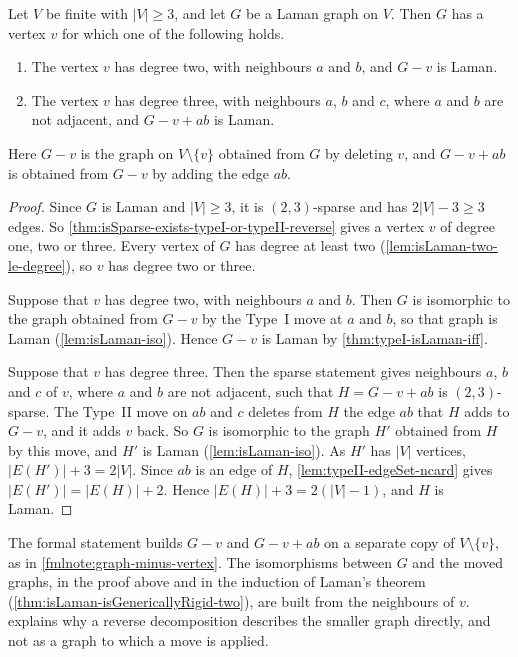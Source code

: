 \begin{theorem}
  \label{thm:isLaman-exists-typeI-or-typeII-reverse}
  \leanok
  Let $V$ be finite with $|V| \ge 3$, and let $G$ be a Laman graph on
  $V$. Then $G$ has a vertex $v$ for which one of the following holds.
  \begin{enumerate}
    \item The vertex $v$ has degree two, with neighbours $a$ and $b$,
      and $G - v$ is Laman.
    \item The vertex $v$ has degree three, with neighbours $a$, $b$ and
      $c$, where $a$ and $b$ are not adjacent, and $G - v + ab$ is
      Laman.
  \end{enumerate}
  Here $G - v$ is the graph on $V \setminus \{v\}$ obtained from $G$
  by deleting $v$, and $G - v + ab$ is obtained from $G - v$ by adding
  the edge $ab$.
\end{theorem}
\begin{proof}
  \leanok
  Since $G$ is Laman and $|V| \ge 3$, it is $(2,3)$-sparse and has
  $2|V| - 3 \ge 3$ edges. So
  \cref{thm:isSparse-exists-typeI-or-typeII-reverse} gives a vertex
  $v$ of degree one, two or three. Every vertex of $G$ has degree at
  least two (\cref{lem:isLaman-two-le-degree}), so $v$ has degree two
  or three.

  Suppose that $v$ has degree two, with neighbours $a$ and $b$. Then
  $G$ is isomorphic to the graph obtained from $G - v$ by the Type~I
  move at $a$ and $b$, so that graph is Laman (\cref{lem:isLaman-iso}).
  Hence $G - v$ is Laman by \cref{thm:typeI-isLaman-iff}.

  Suppose that $v$ has degree three. Then the sparse statement gives
  neighbours $a$, $b$ and $c$ of $v$, where $a$ and $b$ are not
  adjacent, such that $H = G - v + ab$ is $(2,3)$-sparse. The Type~II
  move on $ab$ and $c$ deletes from $H$ the edge $ab$ that $H$ adds to
  $G - v$, and it adds $v$ back. So $G$ is isomorphic to the graph $H'$
  obtained from $H$ by this move, and $H'$ is Laman
  (\cref{lem:isLaman-iso}). As $H'$ has $|V|$ vertices,
  $|E(H')| + 3 = 2|V|$. Since $ab$ is an edge of $H$,
  \cref{lem:typeII-edgeSet-ncard} gives $|E(H')| = |E(H)| + 2$. Hence
  $|E(H)| + 3 = 2(|V| - 1)$, and $H$ is Laman.
\end{proof}
\begin{fmlnote}
  The formal statement builds $G - v$ and $G - v + ab$ on a separate
  copy of $V \setminus \{v\}$, as in \cref{fmlnote:graph-minus-vertex}.
  The isomorphisms between $G$ and the moved graphs, in the proof above
  and in the induction of Laman's theorem
  (\cref{thm:isLaman-isGenericallyRigid-two}), are built from the
  neighbours of $v$.  explains why
  a reverse decomposition describes the smaller graph directly, and not
  as a graph to which a move is applied.
\end{fmlnote}

